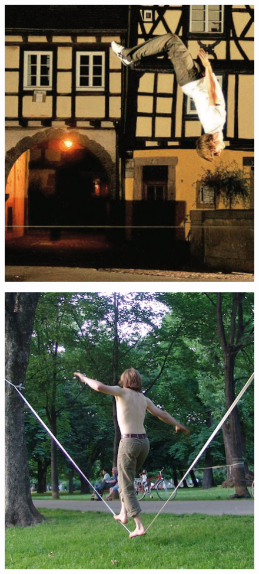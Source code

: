 \begin{figure}[htb]
\begin{minipage}[t]{0.45\linewidth}
		\includegraphics[width=1\linewidth]{Pictures/3_1_jumpline}
		\label{fig:jumpline}
		\vspace{0.4cm}
	\end{minipage}
	\hfill
	\begin{minipage}[t]{0.45\linewidth}
		\centering
		\includegraphics[width=1\linewidth]{Pictures/3_1_rodeoline}

\end{minipage}
\end{figure}
